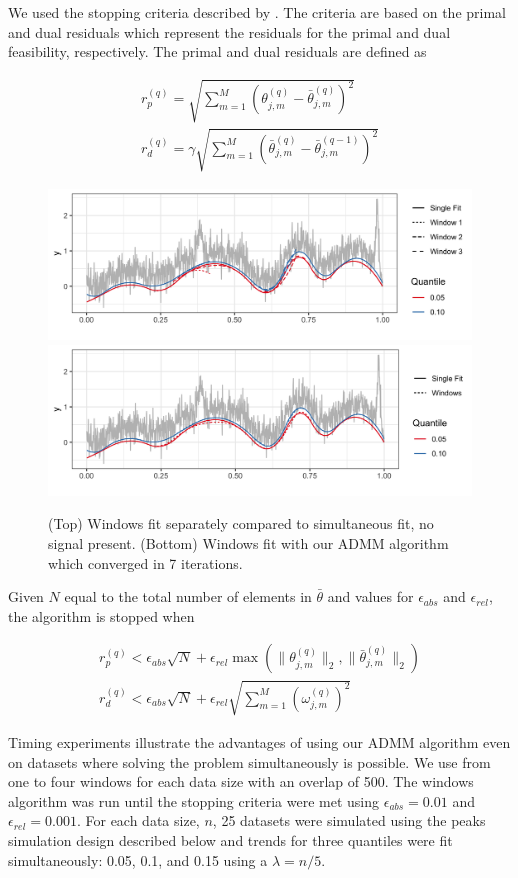 \documentclass[12pt]{article}
\begin{document}
	We used the stopping criteria described by \cite{boyd2011distributed}. The criteria are based on the primal and dual residuals which represent the residuals for the primal and dual feasibility, respectively. The primal and dual residuals are defined as 
	
	\begin{eqnarray}
	r_p^{(q)} = \sqrt{\sum_{m=1}^M \left(\theta_{j,m}^{(q)} - \bar{\theta}_{j,m}^{(q)}\right)^2}\\
	r_d^{(q)} = \gamma\sqrt{\sum_{m=1}^M \left(\bar{\theta}_{j,m}^{(q)} - \bar{\theta}_{j,m}^{(q-1)}\right)^2}
	\end{eqnarray}
	
	\begin{figure}[!h] 
		\centering
		\caption{(Top) Windows fit separately compared to simultaneous fit, no signal present. (Bottom) Windows fit with our ADMM algorithm which converged in 7 iterations.}
		\includegraphics[width = 0.7\linewidth]{Figures/overlapping_windows.png}
		\includegraphics[width = 0.7\linewidth]{Figures/admm_windows.png}
	\end{figure}
	
	Given $N$ equal to the total number of elements in $\bar{\theta}$ and values for $\epsilon_{abs}$ and $\epsilon_{rel}$, the algorithm is stopped when 
	
	\begin{eqnarray}
		r_p^{(q)} < \epsilon_{abs}\sqrt{N} + \epsilon_{rel}\max(\lVert \theta_{j,m}^{(q)} \rVert_2, \lVert \bar{\theta}_{j,m}^{(q)} \rVert_2 )\\
		r_d^{(q)} < \epsilon_{abs}\sqrt{N} + \epsilon_{rel}\sqrt{\sum_{m=1}^M \left(\omega_{j,m}^{(q)}\right)^2}
	\end{eqnarray}
	
	Timing experiments illustrate the advantages of using our ADMM algorithm even on datasets where solving the problem simultaneously is possible. We use from one to four windows for each data size with an overlap of 500. The windows algorithm was run until the stopping criteria were met using $\epsilon_{abs} = 0.01$ and $\epsilon_{rel} = 0.001$. For each data size, $n$, 25 datasets were simulated using the peaks simulation design described below and trends for three quantiles were fit simultaneously: 0.05, 0.1, and 0.15 using a $\lambda = n/5$.
	
\end{document}
